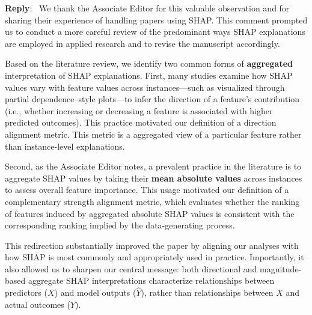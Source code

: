 \documentclass[11pt]{article}
\newcounter{se}[section]
\newenvironment{reply}
 {\par\medskip \noindent \begin{sf}\textbf{Reply}:\ }
 {\medskip \end{sf}}
\begin{document}
\begin{reply}
We thank the Associate Editor for this valuable observation and for sharing their experience of handling papers using SHAP. This comment prompted us to conduct a more careful review of the predominant ways SHAP explanations are employed in applied research and to revise the manuscript accordingly.

Based on the literature review, we identify two common forms of  \textbf{aggregated} interpretation of SHAP explanations. First, many studies examine how SHAP values vary with feature values across instances—such as visualized through partial dependence–style plots—to infer the direction of a feature’s contribution (i.e., whether increasing or decreasing a feature is associated with higher predicted outcomes). This practice motivated our definition of a direction alignment metric. This metric is a aggregated view of a particular feature rather than instance-level explanations.

Second, as the Associate Editor notes, a prevalent practice in the literature is to {aggregate} SHAP values by taking their \textbf{mean absolute values} across instances to assess overall feature importance. This usage motivated our definition of a complementary strength alignment metric, which evaluates whether the ranking of features induced by aggregated absolute SHAP values is consistent with the corresponding ranking implied by the data-generating process. 

This redirection substantially improved the paper by aligning our analyses with how SHAP is most commonly and appropriately used in practice. Importantly, it also allowed us to sharpen our central message: both directional and magnitude-based aggregate SHAP interpretations characterize relationships between predictors ($X$) and model outputs ($\hat{Y}$), rather than relationships between $X$ and actual outcomes ($Y$).%

\end{reply}
\end{document}
